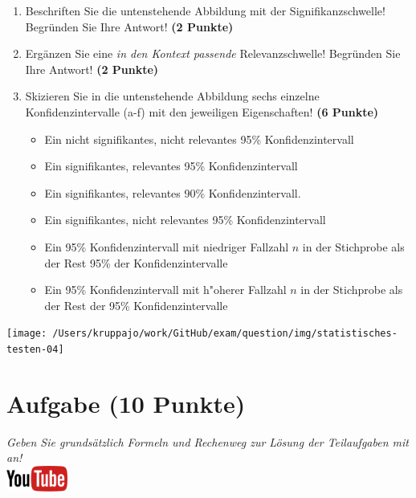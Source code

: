 \documentclass[a4paper, 9pt]{scrartcl}\usepackage[]{graphicx}\usepackage[]{xcolor}
\begin{document}
\begin{enumerate}
\item Beschriften Sie die untenstehende Abbildung mit der
  Signifikanzschwelle! Begr{\"u}nden Sie Ihre Antwort! \textbf{(2 Punkte)}
\item Erg{\"a}nzen Sie eine \textit{in den Kontext passende} Relevanzschwelle!
  Begr{\"u}nden Sie Ihre Antwort! \textbf{(2 Punkte)} 
\item Skizieren Sie in die
  untenstehende Abbildung sechs einzelne Konfidenzintervalle (a-f) mit den
  jeweiligen Eigenschaften! \textbf{(6 Punkte)}
  \begin{itemize}
  \item[(a)] Ein nicht signifikantes, nicht relevantes 95\% Konfidenzintervall 	
  \item[(b)] Ein signifikantes, relevantes 95\% Konfidenzintervall 	
  \item[(c)] Ein signifikantes, relevantes 90\% Konfidenzintervall. 	
  \item[(d)] Ein signifikantes, nicht relevantes 95\% Konfidenzintervall 
  \item[(e)] Ein 95\% Konfidenzintervall mit niedriger Fallzahl $n$ in der Stichprobe als der Rest 95\% der Konfidenzintervalle
  \item[(f)] Ein 95\% Konfidenzintervall mit h{"o}herer Fallzahl $n$ in der Stichprobe als der Rest der 95\% Konfidenzintervalle
  \end{itemize}
\end{enumerate}

\begin{center}
  \texttt{[image: /Users/kruppajo/work/GitHub/exam/question/img/statistisches-testen-04]}
\end{center}


 
\clearpage

\section{Aufgabe \hfill (10 Punkte)}

\textit{Geben Sie grunds{\"a}tzlich Formeln und Rechenweg zur L{\"o}sung der
  Teilaufgaben mit an!} \\[1Ex]

\hfill\href{https://youtu.be/FgZmpnEWDag}{\includegraphics[width =
  2cm]{img/youtube}}\\[1Ex]
\end{document}

